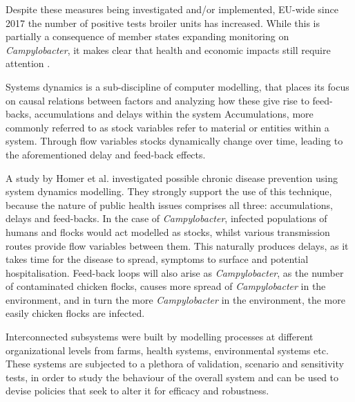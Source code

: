 Despite these measures being investigated and/or implemented, EU-wide since 2017 the number of positive tests broiler units has increased. While this is partially a consequence of member states expanding monitoring on \textit{Campylobacter}, it makes clear that health and economic impacts still require attention \parencite{nastasijevic_european_2020}.

Systems dynamics is a sub-discipline of computer modelling, that places its focus on causal relations between factors and analyzing how these give rise to feed-backs, accumulations and delays within the system \parencite{} Accumulations, more commonly referred to as stock variables refer to material or entities within a system. Through flow variables stocks dynamically change over time, leading to the aforementioned delay and feed-back effects. 

A study by Homer et al. investigated possible chronic disease prevention using system dynamics modelling. They strongly support the use of this technique, because the nature of public health issues comprises all three: accumulations, delays and feed-backs\parencite{homer_system_2006}. In the case of \textit{Campylobacter}, infected populations of humans and flocks would act modelled as stocks, whilst various transmission routes provide flow variables between them. This naturally produces delays, as it takes time for the disease to spread, symptoms to surface and potential hospitalisation. Feed-back loops will also arise as \textit{Campylobacter}, as the number of contaminated chicken flocks, causes more spread of \textit{Campylobacter} in the environment, and in turn the more \textit{Campylobacter} in the environment, the more easily chicken flocks are infected. 

Interconnected subsystems were built by modelling processes at different organizational levels from farms, health systems, environmental systems etc. These systems are subjected to a plethora of validation, scenario and sensitivity tests, in order to study the behaviour of the overall system and can be used to devise policies that seek to alter it for efficacy and robustness. 


